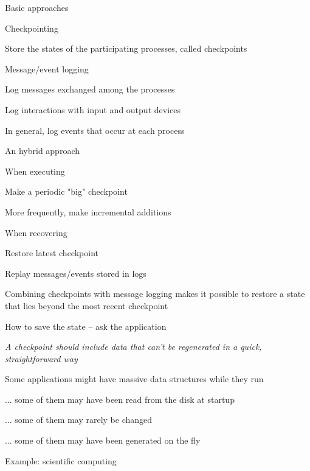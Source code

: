 \begin{frame}{Basic approaches}
	
\begin{block}{Checkpointing}
\BI
\item Store the states of the participating processes, called checkpoints 
\EI
\end{block}
\begin{block}{Message/event logging}
\BI
\item Log messages exchanged among the processes 
\item Log interactions with input and output devices
\item In general, log events that occur at each process	
\EI
\end{block}	
\end{frame}

\begin{frame}{An hybrid approach}
\BIL
\item \alert{When executing}
\BI
\item Make a periodic "big" checkpoint
\item More frequently, make incremental additions
\EI
\item \alert{When recovering}
\BI
\item Restore latest checkpoint
\item Replay messages/events stored in logs
\item Combining checkpoints with message logging makes it possible to restore a state that lies beyond the most recent checkpoint
\EI
\EIL
\end{frame}

\begin{frame}{How to save the state -- ask the application}
	
\BIL
\item \emph{A checkpoint should include data that can't be regenerated
in a quick, straightforward way}
\item Some applications might have massive data structures while they run
\BI
\item ... some of them may have been read from the disk at startup
\item ... some of them may rarely be changed
\item ... some of them may have been generated on the fly
\EI
\item Example: scientific computing
\EIL
\end{frame}

